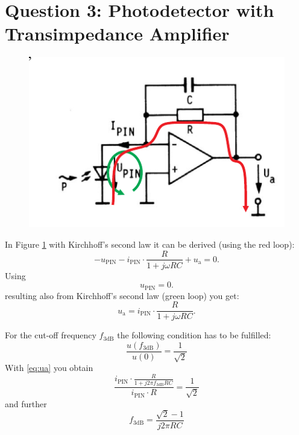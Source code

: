 \section{Question 3: Photodetector with Transimpedance Amplifier}

\begin{figure}[h]%
\centering
\includegraphics[width=.8\columnwidth]{Grafiken/OPAMP_m.pdf}
\caption{}%
\label{fig:OPAMP}%

\end{figure}

In Figure \ref{fig:OPAMP} with Kirchhoff's second law it can be derived (using the red loop):
\begin{equation}
 - u_{\mathrm{PIN}} - i_{\mathrm{PIN}}\cdot \frac{R}{1+ j\omega RC}+u_{\mathrm{a}} = 0 .
\label{eq:masche1}
\end{equation}
Using
\begin{equation}
 u_{\mathrm{PIN}}=0.
\label{eq:masche2}
\end{equation}
resulting also from Kirchhoff's second law (green loop) you get:
\begin{equation}
 u_{\mathrm{a}} = i_{\mathrm{PIN}}\cdot \frac{R}{1+ j\omega RC}.
\label{eq:ua}
\end{equation}

For the cut-off frequency $f_{\mathrm{3dB}}$ the following condition has to be fulfilled:
\begin{equation}
 \frac{u(f_{\mathrm{3dB}})}{u(0)} = \frac{1}{\sqrt{2}}
\end{equation}
With \eqref{eq:ua} you obtain
\begin{equation}
 \frac{i_{\mathrm{PIN}}\cdot \frac{R}{1+ j2\pi f_{\mathrm{3dB}} RC}}{i_{\mathrm{PIN}}\cdot R} = \frac{1}{\sqrt{2}}
\end{equation}
and further
\begin{equation}
 f_{\mathrm{3dB}} = \frac{\sqrt{2}-1}{j2\pi RC} 
\end{equation}

 

